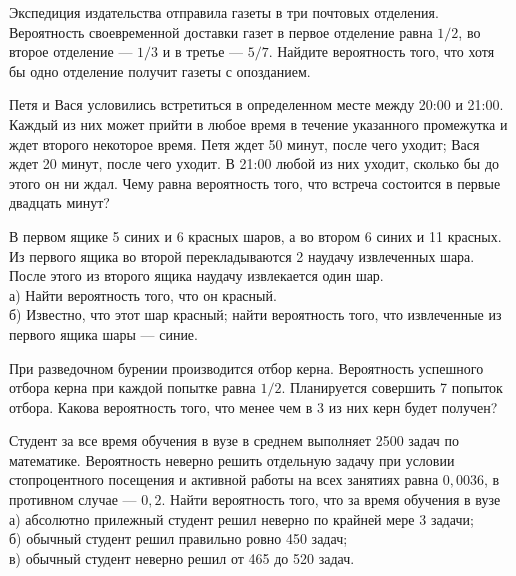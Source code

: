 \newpage\setcounter{zad}{0}



\begin{zkrW}{20}\noindent 
	Экспедиция издательства отправила газеты в три почтовых отделения. Вероятность своевременной доставки газет в первое отделение равна $1/2$, во второе отделение --- $1/3$ и в третье --- $5/7$. Найдите вероятность того, что хотя бы одно отделение получит газеты с опозданием.
 
\end{zkrW}

\begin{zkrW}{20}\noindent 
	Петя и Вася условились встретиться в определенном месте между 20:00 и 21:00. Каждый из них может прийти в любое время в течение указанного промежутка и ждет второго некоторое время. Петя ждет 50 минут, после чего уходит; Вася ждет 20 минут, после чего уходит. В 21:00 любой из них уходит, сколько бы до этого он ни ждал. Чему равна вероятность того, что встреча состоится в первые двадцать минут?
 
\end{zkrW}

\begin{zkrW}{20}\noindent 
	В первом ящике 5 синих и 6 красных шаров, а во втором 6 синих и 11 красных. Из первого ящика во второй перекладываются 2 наудачу извлеченных шара. После этого из второго ящика наудачу извлекается один шар. \\ \indent а) Найти вероятность того, что он красный. \\ \indent б) Известно, что этот шар красный; найти вероятность того, что извлеченные из первого ящика шары --- синие.
 
\end{zkrW}

\begin{zkrW}{20}\noindent 
	При разведочном бурении производится отбор керна. Вероятность успешного отбора керна при каждой попытке равна $1/2$. Планируется совершить 7 попыток отбора. Какова вероятность того, что менее чем в 3 из них керн будет получен?
 
\end{zkrW}

\begin{zkrW}{20}\noindent 
	Студент за все время обучения в вузе в среднем выполняет 2500 задач по математике. Вероятность неверно решить отдельную задачу при условии стопроцентного посещения и активной работы на всех занятиях равна $0{,}0036$, в противном случае --- $0{,}2$. Найти вероятность того, что за время обучения в вузе \\ \indent а) абсолютно прилежный студент решил неверно по крайней мере 3 задачи; \\ \indent б) обычный студент решил правильно ровно 450 задач; \\ \indent в) обычный студент неверно решил от 465 до 520 задач.
 
\end{zkrW}

